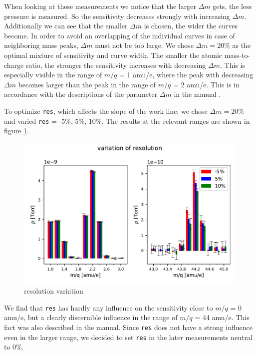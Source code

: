     When looking at these measurements we notice that the larger $\Delta m$ gets, the less pressure is measured. So the sensitivity decreases strongly with increasing $\Delta m$. Additionally we can see
    that the smaller $\Delta m$ is chosen, the wider the curves become. In order to avoid an overlapping of the individual curves in case of neighboring mass peaks, $\Delta m$ must not be too large. We chose $\Delta m= 20\%$ as the optimal mixture of sensitivity and curve width. The smaller the atomic mass-to-charge ratio, the stronger the sensitivity increases with decreasing $\Delta m$. This is especially visible in the range of $m/q$ = 1 amu/e, where the peak with decreasing $\Delta m$ becomes larger than the peak in the range of $m/q$ = 2 amu/e. This is in accordance with the descriptions of the parameter $\Delta m$ in the manual \cite{manual}. 
    
    To optimize \texttt{res}, which affects the slope of the work line, we chose $\Delta m = 20\%$ and varied \texttt{res} = -5\%, 5\%, 10\%. The results at the relevant ranges are shown in figure \ref{fig:resolution_variation}.
    
    \begin{figure}[h!]
        \centering
        \includegraphics[width=1 \textwidth]{Report/DataResultsPlots/resolution_variation_h2_and_co2.pdf}
        \caption{resolution variation}
        \label{fig:resolution_variation}
    \end{figure}
    
    We find that \texttt{res} has hardly any influence on the sensitivity close to $m/q$ = 0 amu/e, but a clearly discernible influence in the range of $m/q$ = 44 amu/e. This fact was also described in the manual. Since \texttt{res} does not have a strong influence even in the larger range, we decided to set \texttt{res} in the later measurements neutral to 0\%. 
    
